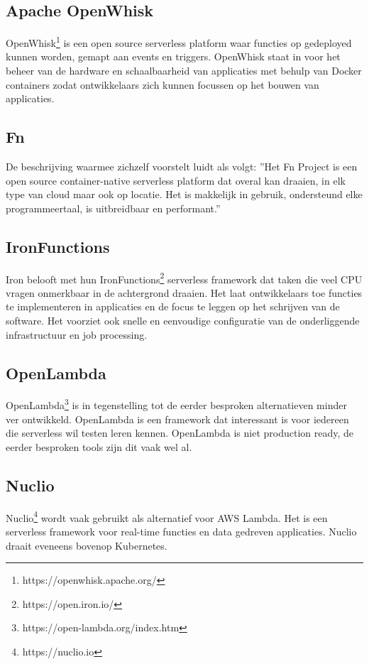 \subsection{Apache OpenWhisk}
OpenWhisk\footnote{https://openwhisk.apache.org/} is een open source serverless platform waar functies op gedeployed kunnen worden, gemapt aan events en triggers. OpenWhisk staat in voor het beheer van de hardware en schaalbaarheid van applicaties met behulp van Docker containers zodat ontwikkelaars zich kunnen focussen op het bouwen van applicaties.

\subsection{Fn}
De beschrijving waarmee \textcite{FnProject2019} zichzelf voorstelt luidt als volgt: ''Het Fn Project is een open source container-native serverless platform dat overal kan draaien, in elk type van cloud maar ook op locatie. Het is makkelijk in gebruik, ondersteund elke programmeertaal, is uitbreidbaar en performant.''

\subsection{IronFunctions}
Iron belooft met hun IronFunctions\footnote{https://open.iron.io/} serverless framework dat taken die veel CPU vragen onmerkbaar in de achtergrond draaien. Het laat ontwikkelaars toe functies te implementeren in applicaties en de focus te leggen op het schrijven van de software. Het voorziet ook snelle en eenvoudige configuratie van de onderliggende infrastructuur en job processing.

\subsection{OpenLambda}
OpenLambda\footnote{https://open-lambda.org/index.htm} is in tegenstelling tot de eerder besproken alternatieven minder ver ontwikkeld. OpenLambda is een framework dat interessant is voor iedereen die serverless wil testen leren kennen. OpenLambda is niet production ready, de eerder besproken tools zijn dit vaak wel al.

\subsection{Nuclio}
Nuclio\footnote{https://nuclio.io} wordt vaak gebruikt als alternatief voor AWS Lambda. Het is een serverless framework voor real-time functies en data gedreven applicaties. Nuclio draait eveneens bovenop Kubernetes.

